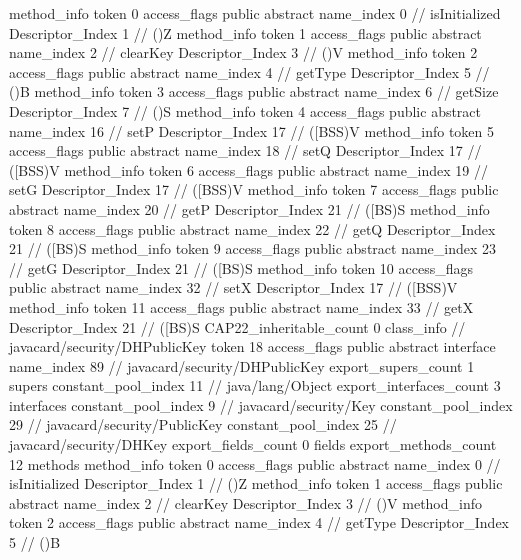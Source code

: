 {{{{				method_info {
					token	0
					access_flags	public abstract
					name_index	0		// isInitialized
					Descriptor_Index	1		// ()Z
				}
				method_info {
					token	1
					access_flags	public abstract
					name_index	2		// clearKey
					Descriptor_Index	3		// ()V
				}
				method_info {
					token	2
					access_flags	public abstract
					name_index	4		// getType
					Descriptor_Index	5		// ()B
				}
				method_info {
					token	3
					access_flags	public abstract
					name_index	6		// getSize
					Descriptor_Index	7		// ()S
				}
				method_info {
					token	4
					access_flags	public abstract
					name_index	16		// setP
					Descriptor_Index	17		// ([BSS)V
				}
				method_info {
					token	5
					access_flags	public abstract
					name_index	18		// setQ
					Descriptor_Index	17		// ([BSS)V
				}
				method_info {
					token	6
					access_flags	public abstract
					name_index	19		// setG
					Descriptor_Index	17		// ([BSS)V
				}
				method_info {
					token	7
					access_flags	public abstract
					name_index	20		// getP
					Descriptor_Index	21		// ([BS)S
				}
				method_info {
					token	8
					access_flags	public abstract
					name_index	22		// getQ
					Descriptor_Index	21		// ([BS)S
				}
				method_info {
					token	9
					access_flags	public abstract
					name_index	23		// getG
					Descriptor_Index	21		// ([BS)S
				}
				method_info {
					token	10
					access_flags	public abstract
					name_index	32		// setX
					Descriptor_Index	17		// ([BSS)V
				}
				method_info {
					token	11
					access_flags	public abstract
					name_index	33		// getX
					Descriptor_Index	21		// ([BS)S
				}
			}
			CAP22_inheritable_count	0
		}
		class_info {		// javacard/security/DHPublicKey
			token	18
			access_flags	public abstract interface
			name_index	89		// javacard/security/DHPublicKey
			export_supers_count	1
			supers {
				constant_pool_index	11		// java/lang/Object
			}
			export_interfaces_count	3
			interfaces {
				constant_pool_index	9		// javacard/security/Key
				constant_pool_index	29		// javacard/security/PublicKey
				constant_pool_index	25		// javacard/security/DHKey
			}
			export_fields_count	0
			fields {
			}
			export_methods_count	12
			methods {
				method_info {
					token	0
					access_flags	public abstract
					name_index	0		// isInitialized
					Descriptor_Index	1		// ()Z
				}
				method_info {
					token	1
					access_flags	public abstract
					name_index	2		// clearKey
					Descriptor_Index	3		// ()V
				}
				method_info {
					token	2
					access_flags	public abstract
					name_index	4		// getType
					Descriptor_Index	5		// ()B
}}}}}
